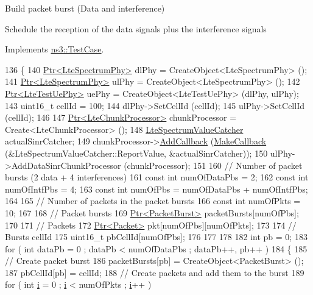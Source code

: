 Build packet burst (Data and interference)

Schedule the reception of the data signals plus the interference signals

Implements \hyperlink{classns3_1_1TestCase_a8ff74680cf017ed42011e4be51917a24}{ns3\+::\+Test\+Case}.


\begin{DoxyCode}
136 \{
140   \hyperlink{classns3_1_1Ptr}{Ptr<LteSpectrumPhy>} dlPhy = CreateObject<LteSpectrumPhy> ();
141   \hyperlink{classns3_1_1Ptr}{Ptr<LteSpectrumPhy>} ulPhy = CreateObject<LteSpectrumPhy> ();
142   \hyperlink{classns3_1_1Ptr}{Ptr<LteTestUePhy>} uePhy = CreateObject<LteTestUePhy> (dlPhy, ulPhy);
143   uint16\_t cellId = 100;
144   dlPhy->SetCellId (cellId);
145   ulPhy->SetCellId (cellId);
146 
147   \hyperlink{classns3_1_1Ptr}{Ptr<LteChunkProcessor>} chunkProcessor = Create<LteChunkProcessor> ();
148   \hyperlink{classns3_1_1LteSpectrumValueCatcher}{LteSpectrumValueCatcher} actualSinrCatcher;
149   chunkProcessor->\hyperlink{classns3_1_1LteChunkProcessor_a122d4a00d72e68a0a8b2cbdd165cdfd8}{AddCallback} (\hyperlink{group__makecallbackmemptr_ga9376283685aa99d204048d6a4b7610a4}{MakeCallback} (&LteSpectrumValueCatcher::ReportValue, 
      &actualSinrCatcher));
150   ulPhy->AddDataSinrChunkProcessor (chunkProcessor);
151 
160   \textcolor{comment}{// Number of packet bursts (2 data + 4 interferences)}
161   \textcolor{keyword}{const} \textcolor{keywordtype}{int} numOfDataPbs = 2;
162   \textcolor{keyword}{const} \textcolor{keywordtype}{int} numOfIntfPbs = 4;
163   \textcolor{keyword}{const} \textcolor{keywordtype}{int} numOfPbs = numOfDataPbs + numOfIntfPbs;
164 
165   \textcolor{comment}{// Number of packets in the packet bursts}
166   \textcolor{keyword}{const} \textcolor{keywordtype}{int} numOfPkts = 10;
167 
168   \textcolor{comment}{// Packet bursts}
169   \hyperlink{classns3_1_1Ptr}{Ptr<PacketBurst>} packetBursts[numOfPbs];
170 
171   \textcolor{comment}{// Packets}
172   \hyperlink{classns3_1_1Ptr}{Ptr<Packet>} pkt[numOfPbs][numOfPkts];
173 
174   \textcolor{comment}{// Bursts cellId}
175   uint16\_t pbCellId[numOfPbs];
176   
177 
178 
182   \textcolor{keywordtype}{int} pb = 0;
183   \textcolor{keywordflow}{for} ( \textcolor{keywordtype}{int} dataPb = 0 ; dataPb < numOfDataPbs ; dataPb++, pb++ )
184     \{
185       \textcolor{comment}{// Create packet burst}
186       packetBursts[pb] = CreateObject<PacketBurst> ();
187       pbCellId[pb] = cellId;
188       \textcolor{comment}{// Create packets and add them to the burst}
189       \textcolor{keywordflow}{for} ( \textcolor{keywordtype}{int} \hyperlink{bernuolliDistribution_8m_a6f6ccfcf58b31cb6412107d9d5281426}{i} = 0 ; \hyperlink{bernuolliDistribution_8m_a6f6ccfcf58b31cb6412107d9d5281426}{i} < numOfPkts ; \hyperlink{bernuolliDistribution_8m_a6f6ccfcf58b31cb6412107d9d5281426}{i}++ )

\end{DoxyCode}
